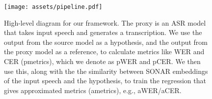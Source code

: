 \begin{figure}[!ht]
    \centering
     \texttt{[image: assets/pipeline.pdf]}

    \caption{High-level diagram for our framework. The proxy is an ASR model that takes input speech and generates a transcription. We use the output from the source model as a hypothesis, and the output from the proxy model as a reference, to calculate metrics like WER and CER (p{metrics}), which we denote as pWER and pCER. We then use this, along with the the similarity between SONAR embeddings of the input speech and the hypothesis, to train the regression that gives approximated metrics (a{metrics}), e.g., aWER/aCER.}
    \label{fig:pipeline_diagram}
\end{figure}
